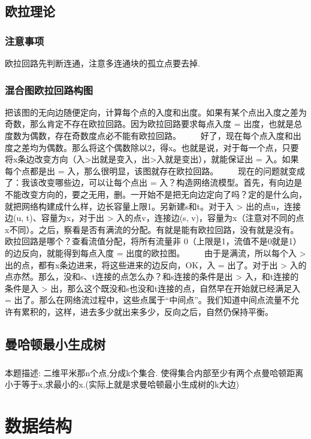 \documentclass[landscape]{report}
\newcommand{\includecode}[2][c]{}
\begin{document}
\begin{flushleft}
\begin{multicols}{2}
\section{ 欧拉理论}
\subsection{ 注意事项} 
欧拉回路先判断连通，注意多连通块的孤立点要去掉.
\includecode[c++]{poj1041.cpp}
\subsection{ 混合图欧拉回路构图}
	把该图的无向边随便定向，计算每个点的入度和出度。如果有某个点出入度之差为奇数，那么肯定不存在欧拉回路。因为欧拉回路要求每点入度 = 出度，也就是总度数为偶数，存在奇数度点必不能有欧拉回路。
　　好了，现在每个点入度和出度之差均为偶数。那么将这个偶数除以2，得x。也就是说，对于每一个点，只要将x条边改变方向（入>出就是变入，出>入就是变出），就能保证出 = 入。如果每个点都是出 = 入，那么很明显，该图就存在欧拉回路。
　　现在的问题就变成了：我该改变哪些边，可以让每个点出 = 入？构造网络流模型。首先，有向边是不能改变方向的，要之无用，删。一开始不是把无向边定向了吗？定的是什么向，就把网络构建成什么样，边长容量上限1。另新建s和t。对于入 > 出的点u，连接边(u, t)、容量为x，对于出 > 入的点v，连接边(s, v)，容量为x（注意对不同的点x不同）。之后，察看是否有满流的分配。有就是能有欧拉回路，没有就是没有。欧拉回路是哪个？查看流值分配，将所有流量非 0（上限是1，流值不是0就是1）的边反向，就能得到每点入度 = 出度的欧拉图。
　　由于是满流，所以每个入 > 出的点，都有x条边进来，将这些进来的边反向，OK，入 = 出了。对于出 > 入的点亦然。那么，没和s、t连接的点怎么办？和s连接的条件是出 > 入，和t连接的条件是入 > 出，那么这个既没和s也没和t连接的点，自然早在开始就已经满足入 = 出了。那么在网络流过程中，这些点属于“中间点”。我们知道中间点流量不允许有累积的，这样，进去多少就出来多少，反向之后，自然仍保持平衡。


\section{ 曼哈顿最小生成树}
\paragraph*{ }
本题描述: 二维平米那n个点,分成k个集合. 使得集合内部至少有两个点曼哈顿距离小于等于x,求最小的x.(实际上就是求曼哈顿最小生成树的k大边)
\includecode[c++]{poj3241.cpp} 

\chapter{数据结构}

\end{multicols}
\end{flushleft}
\end{document}
